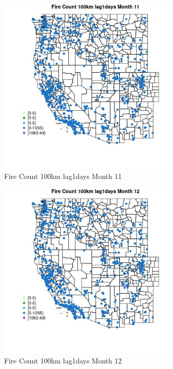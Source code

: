 \begin{figure} 
\centering  
\includegraphics[width=0.77\textwidth]{Code_Outputs/Report_ML_input_PM25_Step4_part_f_de_duplicated_aves_prioritize_24hr_obswNAs_MapObsMo11Fire_Count_100km_lag1days.jpg} 
\caption{\label{fig:Report_ML_input_PM25_Step4_part_f_de_duplicated_aves_prioritize_24hr_obswNAsMapObsMo11Fire_Count_100km_lag1days}Fire Count 100km lag1days Month 11} 
\end{figure} 
 

\begin{figure} 
\centering  
\includegraphics[width=0.77\textwidth]{Code_Outputs/Report_ML_input_PM25_Step4_part_f_de_duplicated_aves_prioritize_24hr_obswNAs_MapObsMo12Fire_Count_100km_lag1days.jpg} 
\caption{\label{fig:Report_ML_input_PM25_Step4_part_f_de_duplicated_aves_prioritize_24hr_obswNAsMapObsMo12Fire_Count_100km_lag1days}Fire Count 100km lag1days Month 12} 
\end{figure} 
 

